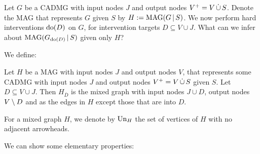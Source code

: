 
Let $G$ be a CADMG with input nodes $J$ and output nodes $V^+ = V \,\dot{\cup}\, S$. 
Denote the MAG that represents $G$ given $S$ by $H := \mathrm{MAG}(G \operatorname*{|} S)$.
We now perform hard interventions $\operatorname{do}(D)$ on $G$, for intervention targets $D \subseteq V \cup J$.
What can we infer about $\mathrm{MAG}(G_{\operatorname{do}(D)} \operatorname*{|} S)$ given only $H$?

We define:
\begin{Def}\label{def:do_mag}
  Let $H$ be a MAG with input nodes $J$ and output nodes $V$, that represents some CADMG with input nodes $J$ and output nodes $V^+ = V \,\dot{\cup}\, S$ given $S$.
  Let $D \subseteq V \cup J$.
  Then $H_{\bar{D}}$ is the mixed graph with input nodes $J \cup D$, output nodes $V \setminus D$ and as the edges in $H$ except those that are into $D$.
\end{Def}
\begin{Def}
  For a mixed graph $H$, we denote by $\mathrm{Un}_H$ the set of vertices of $H$ with no adjacent arrowheads.
\end{Def}
We can show some elementary properties:
